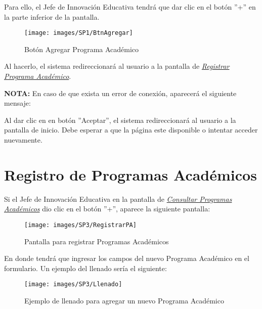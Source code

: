         	Para ello, el Jefe de Innovación Educativa tendrá que dar clic en el botón ''+'' en la parte inferior de la pantalla.
        
        	\begin{figure}[!hbtp]
        		\centering
        		\hypertarget{add}{\texttt{[image: images/SP1/BtnAgregar]}}
        		\caption{Botón Agregar Programa Académico}
        		\label{add}
        	\end{figure}
        
        	Al hacerlo, el sistema redireccionará al usuario a la pantalla de \hyperlink{registrarpa}{\textit{Registrar Programa Académico}}.
        
            \textbf{NOTA:} En caso de que exista un error de conexión, aparecerá el siguiente mensaje:
        
            Al dar clic en en botón ''Aceptar'', el sistema redireccionará al usuario a la pantalla de inicio. Debe esperar a que la página este disponible o intentar acceder nuevamente.
\newpage
    
    \section{Registro de Programas Académicos}
        Si el Jefe de Innovación Educativa en la pantalla de \hyperlink{consultarpa}{\textit{Consultar  Programas Académicos}} dio clic en el botón ''+'', aparece la siguiente pantalla:

        \begin{figure}[!hbtp]
            \centering
            \hypertarget{registrarpa}{\texttt{[image: images/SP3/RegistrarPA]}}
            \caption{Pantalla para registrar Programas Académicos}
            \label{registrarpa}
        \end{figure}
        
        En donde tendrá que ingresar los campos del nuevo Programa Académico en el formulario. Un ejemplo del llenado sería el siguiente:
    
        \begin{figure}[!hbtp]
        	\centering
        	\hypertarget{ejreg}{\texttt{[image: images/SP3/Llenado]}}
        	\caption{Ejemplo de llenado para agregar un nuevo Programa Académico}
        	\label{ejreg}
        \end{figure}

